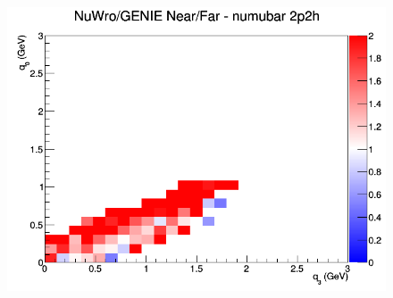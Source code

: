 \documentclass[12pt]{article}
\begin{document}
\begin{figure}[h]
\endminipage
{}
\includegraphics[width=\linewidth]{eff_q0_q3/FGT/ratios/2p2h_NuWro_GENIE_numubar_NF_q3_q0.png}
\endminipage
\newline
\end{figure}
\clearpage
\end{document}
